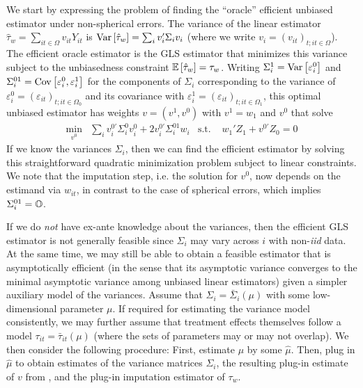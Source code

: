 \documentclass[english,11pt]{article}
\theoremstyle{plain}
\theoremstyle{plain}
\theoremstyle{plain}
\theoremstyle{plain}
\let\ref\Cref
\begin{document}
We start by expressing the problem of finding the ``oracle'' efficient
unbiased estimator under non-spherical errors. The variance of the
linear estimator $\hat{\tau}_{w}=\sum_{it\in\Omega}v_{it}Y_{it}$
is $\mathrm{Var}\left[\hat{\tau}_{w}\right]=\sum_{i}v_{i}'\Sigma_{i}v_{i}$ (where we
write $v_{i}=(v_{it})_{t;it\in\Omega}$). The efficient oracle estimator
is the GLS estimator that minimizes this variance subject to the unbiasedness
constraint $\mathbb{E}\left[\hat{\tau}_{w}\right]=\tau_{w}$. Writing $\Sigma_{i}^{1}=\mathrm{Var}\left[\varepsilon_{i}^{0}\right]$
and $\Sigma_{i}^{01}=\mathrm{Cov}\left[\varepsilon_{i}^{0},\varepsilon_{i}^{1}\right]$
for the components of $\Sigma_{i}$ corresponding to the variance
of $\varepsilon_{i}^{0}=(\varepsilon_{it})_{t;it\in\Omega_{0}}$ and
its covariance with $\varepsilon_{i}^{1}=(\varepsilon_{it})_{t;it\in\Omega_{1}}$,
this optimal unbiased estimator has weights $v=(v^{1},v^{0})$ with
$v^{1}=w_{1}$ and $v^{0}$ that solve
\begin{align}
\min_{v^{0}} & \sum_{i}v_{i}^{0\prime}\Sigma_{i}^{0}v_{i}^{0}+2v_{i}^{0\prime}\Sigma_{i}^{01}w_{i} & \text{s.t. } & w_{1}'Z_{1}+v^{0\prime}Z_{0}=0\label{eq:optimization}
\end{align}
If we know the variances $\Sigma_{i}$, then we can find the efficient
estimator by solving this straightforward quadratic minimization problem
subject to linear constraints. We note that the imputation step, i.e.
the solution for $v^{0}$, now depends on the estimand via $w_{it}$,
in contrast to the case of spherical errors, which implies $\Sigma_{i}^{01}=\mathbb{O}$.

If we do \textit{not} have ex-ante knowledge about the variances,
then the efficient GLS estimator is not generally feasible since $\Sigma_{i}$
may vary across $i$ with non-\emph{iid} data. At the same time, we
may still be able to obtain a feasible estimator that is asymptotically
efficient (in the sense that its asymptotic variance converges to
the minimal asymptotic variance among unbiased linear estimators)
given a simpler auxiliary model of the variances. Assume that $\Sigma_{i}=\bar{\Sigma}_{i}(\mu)$
with some low-dimensional parameter $\mu$. If required for estimating
the variance model consistently, we may further assume that treatment
effects themselves follow a model $\tau_{it}=\bar{\tau}_{it}(\mu)$
(where the sets of parameters may or may not overlap). We then consider
the following procedure: First, estimate $\mu$ by some $\hat{\mu}$.
Then, plug in $\hat{\mu}$ to obtain estimates of the variance matrices
$\Sigma_{i}$, the resulting plug-in estimate of $v$ from \ref{eq:optimization},
and the plug-in imputation estimator of $\tau_{w}$.
\end{document}
